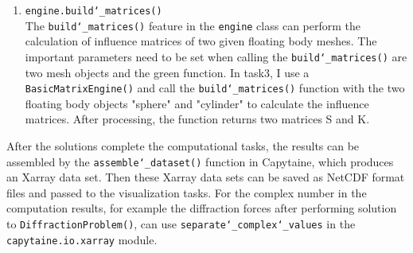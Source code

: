 \documentclass{article}
\begin{document}
\begin{enumerate}
    \item \texttt{engine.build\char`_matrices()}\\
    The \texttt{build\char`_matrices()} feature in the \texttt{engine} class can perform the calculation of influence matrices of two given floating body meshes. The important parameters need to be set when calling the \texttt{build\char`_matrices()} are two mesh objects and the green function. In task3, I use a \texttt{BasicMatrixEngine()} and call the \texttt{build\char`_matrices()} function with the two floating body objects "sphere" and "cylinder" to calculate the influence matrices. After processing, the function returns two matrices S and K.
\end{enumerate}
After the solutions complete the computational tasks, the results can be assembled by the \texttt{assemble\char`_dataset()} function in Capytaine, which produces an Xarray data set. Then these Xarray data sets can be saved as NetCDF format files and passed to the visualization tasks. For the complex number in the computation results, for example the diffraction forces after performing solution to \texttt{DiffractionProblem()}, can use \texttt{separate\char`_complex\char`_values} in the \texttt{capytaine.io.xarray} module.
\end{document}
